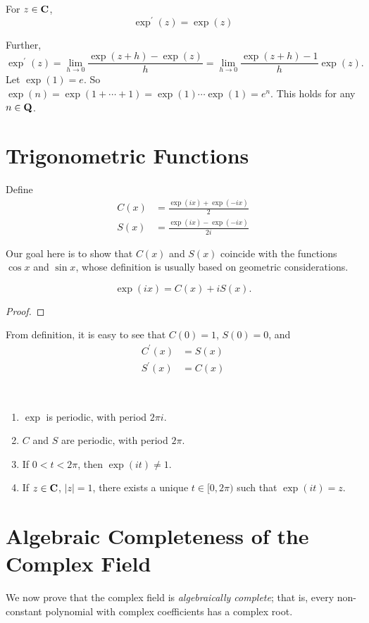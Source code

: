 \begin{proposition}
For $z\in\mathbf C$,
\[\exp^\prime(z)=\exp(z)\]
\end{proposition}

Further,
\[\exp^\prime(z)=\lim_{h\to0}\frac{\exp(z+h)-\exp(z)}{h}=\lim_{h\to0}\frac{\exp(z+h)-1}{h}\exp(z).\]
Let $\exp(1)=e$. So $\exp(n)=\exp(1+\cdots+1)=\exp(1)\cdots\exp(1)=e^n$. This holds for any $n\in\mathbf Q$.

\section{Trigonometric Functions}
Define
\begin{align*}
C(x)&=\frac{\exp(ix)+\exp(-ix)}{2}\\
S(x)&=\frac{\exp(ix)-\exp(-ix)}{2i}
\end{align*}

Our goal here is to show that $C(x)$ and $S(x)$ coincide with the functions $\cos x$ and $\sin x$, whose definition is usually based on geometric considerations.

\begin{proposition}
\[\exp(ix)=C(x)+iS(x).\]
\end{proposition}

\begin{proof}

\end{proof}

From definition, it is easy to see that $C(0)=1$, $S(0)=0$, and
\begin{align*}
C^\prime(x)&=S(x)\\
S^\prime(x)&=C(x)
\end{align*}

\begin{proposition} \
\begin{enumerate}[label=(\roman*)]
\item $\exp$ is periodic, with period $2\pi i$.
\item $C$ and $S$ are periodic, with period $2\pi$.
\item If $0<t<2\pi$, then $\exp(it)\neq1$.
\item If $z\in\mathbf C$, $|z|=1$, there exists a unique $t\in[0,2\pi)$ such that $\exp(it)=z$.
\end{enumerate}
\end{proposition}



\section{Algebraic Completeness of the Complex Field}
We now prove that the complex field is \emph{algebraically complete}; that is, every non-constant polynomial with complex coefficients has a complex root.

